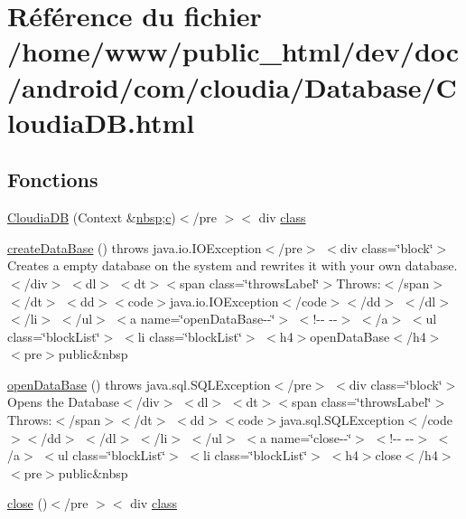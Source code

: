 \hypertarget{_cloudia_d_b_8html}{\section{Référence du fichier /home/www/public\-\_\-html/dev/doc/android/com/cloudia/\-Database/\-Cloudia\-D\-B.html}
\label{_cloudia_d_b_8html}
}
\subsection*{Fonctions}
\begin{DoxyCompactItemize}
\item 
\hyperlink{_cloudia_d_b_8html_a8fed662f2e8a70afe05b00137299392b}{Cloudia\-D\-B} (Context \&\hyperlink{_tools_8html_aef915316f784c9063d942974538301a6}{nbsp};\hyperlink{_connection_8html_ae0323a9039add2978bf5b49550572c7c}{c})$<$/pre $>$$<$ div \hyperlink{_tools_8html_acf06f836132665ba8114f5a414c2403f}{class}
\item 
\hyperlink{_cloudia_d_b_8html_accbf84576c2fd64986de0141f2656f7f}{create\-Data\-Base} ()  throws java.\-io.\-I\-O\-Exception$<$/pre$>$ $<$div class=\char`\"{}block\char`\"{}$>$\-Creates a empty database on the system and rewrites it with your own database.$<$/div$>$ $<$dl$>$ $<$dt$>$$<$span class=\char`\"{}throws\-Label\char`\"{}$>$\-Throws\-:$<$/span$>$$<$/dt$>$ $<$dd$>$$<$code$>$java.\-io.\-I\-O\-Exception$<$/code$>$$<$/dd$>$ $<$/dl$>$ $<$/li$>$ $<$/ul$>$ $<$a name=\char`\"{}open\-Data\-Base-\/-\/\char`\"{}$>$ $<$!-\/-\/   -\/-\/$>$ $<$/a$>$ $<$ul class=\char`\"{}block\-List\char`\"{}$>$ $<$li class=\char`\"{}block\-List\char`\"{}$>$ $<$h4$>$open\-Data\-Base$<$/h4$>$ $<$pre$>$public\&nbsp
\item 
\hyperlink{_cloudia_d_b_8html_aaa00bd23f6c461fd9eae5737f915e313}{open\-Data\-Base} ()  throws java.\-sql.\-S\-Q\-L\-Exception$<$/pre$>$ $<$div class=\char`\"{}block\char`\"{}$>$\-Opens the Database$<$/div$>$ $<$dl$>$ $<$dt$>$$<$span class=\char`\"{}throws\-Label\char`\"{}$>$\-Throws\-:$<$/span$>$$<$/dt$>$ $<$dd$>$$<$code$>$java.\-sql.\-S\-Q\-L\-Exception$<$/code$>$$<$/dd$>$ $<$/dl$>$ $<$/li$>$ $<$/ul$>$ $<$a name=\char`\"{}close-\/-\/\char`\"{}$>$ $<$!-\/-\/   -\/-\/$>$ $<$/a$>$ $<$ul class=\char`\"{}block\-List\char`\"{}$>$ $<$li class=\char`\"{}block\-List\char`\"{}$>$ $<$h4$>$close$<$/h4$>$ $<$pre$>$public\&nbsp
\item 
\hyperlink{_cloudia_d_b_8html_aa6fcc398c51fc8f55e1afe6a0811ee5d}{close} ()$<$/pre $>$$<$ div \hyperlink{_tools_8html_acf06f836132665ba8114f5a414c2403f}{class}

\end{DoxyCompactItemize}
